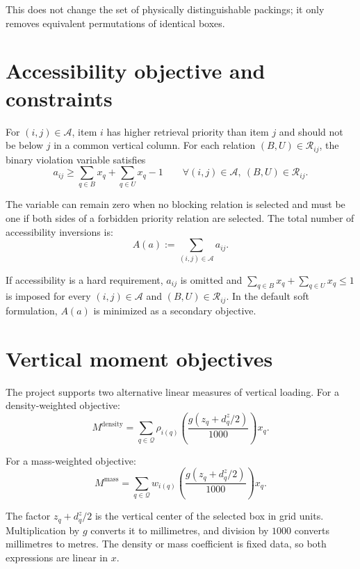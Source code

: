 \documentclass[11pt]{article}
\newcommand{\Place}{\mathcal{Q}}
\begin{document}
This does not change the set of physically distinguishable packings; it only
removes equivalent permutations of identical boxes.

\section{Accessibility objective and constraints}

For $(i,j)\in\mathcal A$, item $i$ has higher retrieval priority than item $j$
and should not be below $j$ in a common vertical column.  For each relation
$(B,U)\in\mathcal R_{ij}$, the binary violation variable satisfies
\begin{equation}
  a_{ij}\ge
  \sum_{q\in B}x_q + \sum_{q\in U}x_q - 1
  \qquad \forall(i,j)\in\mathcal A,\ (B,U)\in\mathcal R_{ij}.
  \label{eq:access-violation}
\end{equation}

The variable can remain zero when no blocking relation is selected and must be
one if both sides of a forbidden priority relation are selected.  The total
number of accessibility inversions is:
\begin{equation}
  A(a):=\sum_{(i,j)\in\mathcal A}a_{ij}.
  \label{eq:access-objective}
\end{equation}

If accessibility is a hard requirement, $a_{ij}$ is omitted and
$\sum_{q\in B}x_q+\sum_{q\in U}x_q\le1$ is imposed for every
$(i,j)\in\mathcal A$ and $(B,U)\in\mathcal R_{ij}$.  In the default soft
formulation, $A(a)$ is minimized as a secondary objective.

\section{Vertical moment objectives}

The project supports two alternative linear measures of vertical loading.
For a density-weighted objective:
\begin{equation}
  M^{\mathrm{density}}
  =\sum_{q\in\Place}
  \rho_{i(q)}
  \left(\frac{g(z_q+d_q^z/2)}{1000}\right)x_q.
  \label{eq:density-moment}
\end{equation}

For a mass-weighted objective:
\begin{equation}
  M^{\mathrm{mass}}
  =\sum_{q\in\Place}
  w_{i(q)}
  \left(\frac{g(z_q+d_q^z/2)}{1000}\right)x_q.
  \label{eq:mass-moment}
\end{equation}

The factor $z_q+d_q^z/2$ is the vertical center of the selected box in grid
units.  Multiplication by $g$ converts it to millimetres, and division by
$1000$ converts millimetres to metres.  The density or mass coefficient is
fixed data, so both expressions are linear in $x$.
\end{document}
